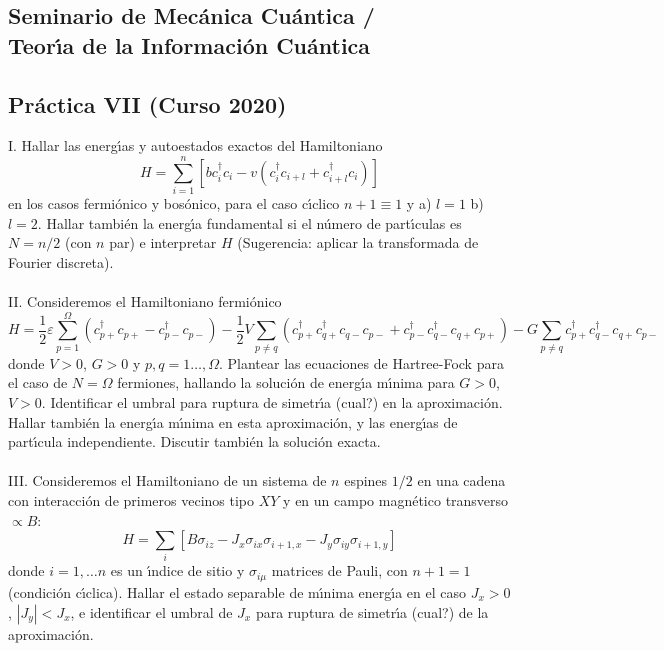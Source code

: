 \documentclass[12pt]{article}
\begin{document}
\begin{center}
\subsection*{Seminario de Mec\'anica Cu\'antica / \\Teor\'{\i}a de la Informaci\'on Cu\'antica}
\subsection*{Pr\'actica VII (Curso 2020)}
\end{center}
I. Hallar las energ\'{\i}as y autoestados exactos del Hamiltoniano 
\[H=\sum_{i=1}^n [bc^\dagger_ic_i-v(c^\dagger_ic_{i+l}+c^\dagger_{i+l}c_i)]\]
en los casos fermi\'onico y bos\'onico, para el caso c\'{\i}clico  $n+1\equiv 1$ y a) $l=1$ b) $l=2$.  Hallar tambi\'en la energ\'{\i}a fundamental si 
el n\'umero de part\'{\i}culas es $N=n/2$ (con $n$ par) e 
interpretar $H$  (Sugerencia: aplicar la transformada de Fourier discreta). 
\\ \\
II. Consideremos el Hamiltoniano  fermi\'onico
\[H=\frac{1}{2}\varepsilon\sum_{p=1}^\Omega (c^\dagger_{p+}c_{p+}-c^\dagger_{p-}c_{p-})-
\frac{1}{2}V\sum_{p\neq q}(c^\dagger_{p+}c^\dagger_{q+}c_{q-}c_{p-}+c^\dagger_{p-}c^\dagger_{q-}c_{q+}c_{p+})-
G\sum_{p\neq q}c^\dagger_{p+}c^\dagger_{q-}c_{q+}c_{p-}\]
donde $V>0$, $G>0$ y $p,q=1\ldots,\Omega$. Plantear las ecuaciones de Hartree-Fock para el caso de $N=\Omega$ fermiones, hallando la soluci\'on de energ\'{\i}a m\'{\i}nima para 
$G>0$, $V>0$.  Identificar el umbral para ruptura de simetr\'{\i}a (cual?) en la aproximaci\'on. Hallar tambi\'en la energ\'{\i}a m\'{\i}nima en esta aproximaci\'on, y las energ\'{\i}as de part\'{\i}cula independiente. Discutir tambi\'en la soluci\'on exacta. 
\\ \\
III. Consideremos el Hamiltoniano de un sistema de $n$ espines $1/2$ en una cadena con interacci\'on de primeros vecinos tipo $XY$ y en un campo magn\'etico transverso $\propto B$:
\[H=\sum_i [B \sigma_{iz}-J_{x}\sigma_{ix}\sigma_{i+1,x}-J_{y}\sigma_{iy}\sigma_{i+1,y}]\] 
donde $i=1,\ldots n$ es un \'{\i}ndice de sitio y $\sigma_{i\mu}$ matrices de Pauli, 
con $n+1=1$ (condici\'on c\'{\i}clica). 
Hallar el estado separable de m\'{\i}nima energ\'{\i}a en el caso $J_{x}>0$, $|J_y|<J_x$, e identificar 
el umbral de $J_x$ para ruptura de simetr\'{\i}a (cual?) de la aproximaci\'on. 
\end{document}

